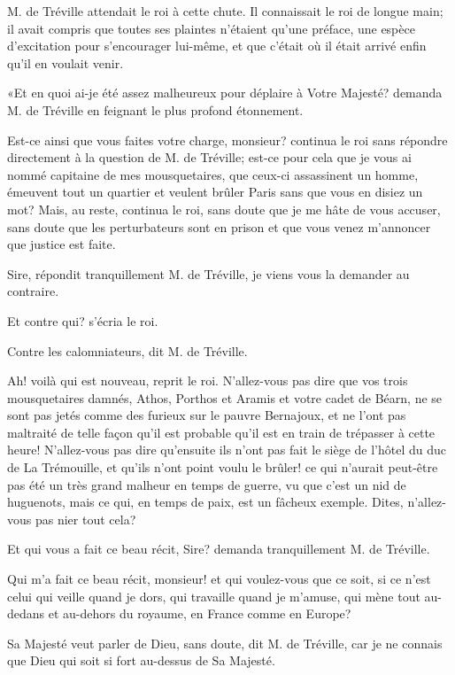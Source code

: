 M. de Tréville attendait le roi à cette chute. Il connaissait le roi de longue main; il avait compris que toutes ses plaintes n'étaient qu'une préface, une espèce d'excitation pour s'encourager lui-même, et que c'était où il était arrivé enfin qu'il en voulait venir. 

«Et en quoi ai-je été assez malheureux pour déplaire à Votre Majesté? demanda M. de Tréville en feignant le plus profond étonnement. 

\speak  Est-ce ainsi que vous faites votre charge, monsieur? continua le roi sans répondre directement à la question de M. de Tréville; est-ce pour cela que je vous ai nommé capitaine de mes mousquetaires, que ceux-ci assassinent un homme, émeuvent tout un quartier et veulent brûler Paris sans que vous en disiez un mot? Mais, au reste, continua le roi, sans doute que je me hâte de vous accuser, sans doute que les perturbateurs sont en prison et que vous venez m'annoncer que justice est faite. 

\speak  Sire, répondit tranquillement M. de Tréville, je viens vous la demander au contraire. 

\speak  Et contre qui? s'écria le roi. 

\speak  Contre les calomniateurs, dit M. de Tréville. 

\speak  Ah! voilà qui est nouveau, reprit le roi. N'allez-vous pas dire que vos trois mousquetaires damnés, Athos, Porthos et Aramis et votre cadet de Béarn, ne se sont pas jetés comme des furieux sur le pauvre Bernajoux, et ne l'ont pas maltraité de telle façon qu'il est probable qu'il est en train de trépasser à cette heure! N'allez-vous pas dire qu'ensuite ils n'ont pas fait le siège de l'hôtel du duc de La Trémouille, et qu'ils n'ont point voulu le brûler! ce qui n'aurait peut-être pas été un très grand malheur en temps de guerre, vu que c'est un nid de huguenots, mais ce qui, en temps de paix, est un fâcheux exemple. Dites, n'allez-vous pas nier tout cela? 

\speak  Et qui vous a fait ce beau récit, Sire? demanda tranquillement M. de Tréville. 

\speak  Qui m'a fait ce beau récit, monsieur! et qui voulez-vous que ce soit, si ce n'est celui qui veille quand je dors, qui travaille quand je m'amuse, qui mène tout au-dedans et au-dehors du royaume, en France comme en Europe? 

\speak  Sa Majesté veut parler de Dieu, sans doute, dit M. de Tréville, car je ne connais que Dieu qui soit si fort au-dessus de Sa Majesté. 

